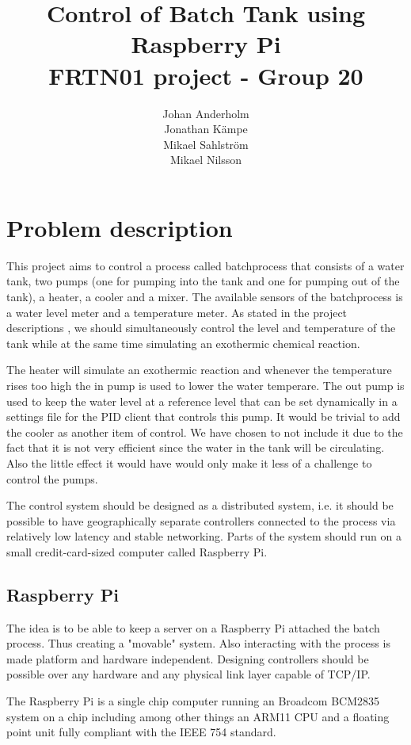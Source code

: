 \documentclass{article}
\title{Control of Batch Tank using Raspberry Pi \\ FRTN01 project - Group 20}
\author{Johan Anderholm \\ Jonathan Kämpe \\ Mikael Sahlström \\ Mikael Nilsson}
\begin{document}
\maketitle
\newpage
\tableofcontents
\newpage
\section{Problem description}
This project aims to control a process called batchprocess that consists
of a water tank, two pumps (one for pumping into the tank and one for
pumping out of the tank), a heater, a cooler and a mixer. The available
sensors of the batchprocess is a water level meter and a temperature
meter. As stated in the project descriptions \cite[p.~6]{project12}, we should
simultaneously control the level and temperature of the tank while at
the same time simulating an exothermic chemical reaction.

The heater will simulate an exothermic reaction and whenever the
temperature rises too high the in pump is used to lower the
water temperare. The out pump is used to keep the water level at a
reference level that can be set dynamically in a settings file for the
PID client that controls this pump. It would be trivial to add the 
cooler as another item of control. We have chosen to not include it
due to the fact that it is not very efficient since the water in the 
tank will be circulating. Also the little effect it would have would 
only make it less of a challenge to control the pumps.

The control system should be designed as a distributed system, i.e. it
should be possible to have geographically separate controllers connected
to the process via relatively low latency and stable networking. Parts
of the system should run on a small credit-card-sized computer called
Raspberry Pi.

\subsection{Raspberry Pi}
The idea is to be able to keep a server on a Raspberry Pi attached the
batch process. Thus creating a "movable" system. Also interacting with
the process is made platform and hardware independent. Designing
controllers should be possible over any hardware and any physical link
layer capable of TCP/IP.

The Raspberry Pi is a single chip computer running an Broadcom BCM2835
system on a chip including among other things an ARM11 CPU and a
floating point unit fully compliant with the IEEE 754 standard.
\end{document}
